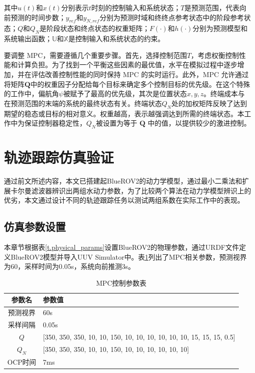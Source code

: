 其中$u(t)$和$x(t)$分别表示$t$时刻的控制输入和系统状态；$T$是预测范围，代表向前预测的时间步数；$y_{ref}$和$y_{N,ref}$分别为预测时域和终终点参考状态中的阶段参考状态；$Q$和$Q_N$是阶段状态和终点状态的权重矩阵；$F(\cdot )$和$h(\cdot )$分别为预测模型和系统输出函数；$\mathbb{U}$和$\mathbb{X}$是控制输入和系统状态的约束。

要调整 MPC，需要遵循几个重要步骤。首先，选择控制范围$T$，考虑权衡控制性能和计算负担。为了找到一个平衡这些因素的最优值，水平在模拟过程中逐步增加，并在评估改善控制性能的同时保持 MPC 的实时运行。此外，MPC 允许通过将矩阵$\symbf{Q}$中的权重因子分配给每个目标来确定多个控制目标的优先级。在这个特殊的工作中，偏航角$\psi $被赋予了最高的优先级，其次是位置状态$x, y, z$。终端成本与在预测范围的末端的系统的最终状态有关。终端状态$Q_N$处的加权矩阵反映了达到期望的稳态或目标的相对意义。权重越高，表示越强调达到所需的终端状态。本工作中为保证控制器稳定性，$Q_N$被设置为等于 $\symbf{Q}$ 中的值，以提供较少的激进控制。

\section{轨迹跟踪仿真验证}

通过前文所述内容，本文已搭建起BlueROV2的动力学模型，通过最小二乘法和扩展卡尔曼滤波器辨识出两组水动力参数，为了比较两个算法在动力学模型辨识上的优劣，本文通过设计不同的轨迹跟踪任务以测试两组系数在实际工作中的表现。

\subsection{仿真参数设置}

本章节根据表\ref{t.physical_params}设置BlueROV2的物理参数，通过URDF文件定义BlueROV2模型并导入UUV Simulator中。表\ref{t.MPC_params}列出了MPC相关参数，预测视界为60，采样时间为0.05s，系统向前推测3s。

\begin{table}[htb]
  \centering
  \caption{MPC控制参数表}
  \label{t.MPC_params}
  \begin{tabular}{cl}
  \hline
参数名 & 参数值\\
\hline
预测视界 & 60s \\
采样间隔 & 0.05s \\
$Q$      & [350, 350, 350, 10, 10, 150, 10, 10, 10, 10, 10, 10, 15, 15, 15, 0.5] \\
$Q_N$   & [350, 350, 350, 10, 10, 150, 10, 10, 10, 10, 10, 10]  \\
OCP时间 & 7ms \\
\hline
\end{tabular}
\end{table}

